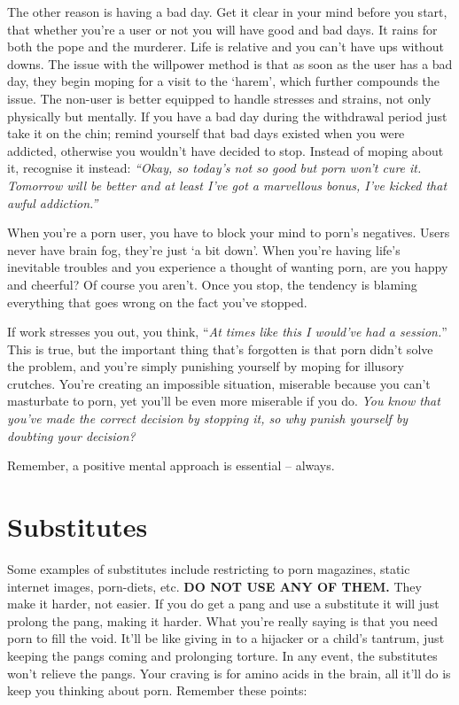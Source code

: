 \documentclass[
]{book}
\begin{document}
The other reason is having a bad day. Get it clear in your mind before you start, that whether you're a user or not you will have good and bad days. It rains for both the pope and the murderer. Life is relative and you can't have ups without downs. The issue with the willpower method is that as soon as the user has a bad day, they begin moping for a visit to the `harem', which further compounds the issue. The non-user is better equipped to handle stresses and strains, not only physically but mentally. If you have a bad day during the withdrawal period just take it on the chin; remind yourself that bad days existed when you were addicted, otherwise you wouldn't have decided to stop. Instead of moping about it, recognise it instead: \emph{``Okay, so today's not so good but porn won't cure it. Tomorrow will be better and at least I've got a marvellous bonus, I've kicked that awful addiction.''}

When you're a porn user, you have to block your mind to porn's negatives. Users never have brain fog, they're just `a bit down'. When you're having life's inevitable troubles and you experience a thought of wanting porn, are you happy and cheerful? Of course you aren't. Once you stop, the tendency is blaming everything that goes wrong on the fact you've stopped.

If work stresses you out, you think, ``\emph{At times like this I would've had a session.}'' This is true, but the important thing that's forgotten is that porn didn't solve the problem, and you're simply punishing yourself by moping for illusory crutches. You're creating an impossible situation, miserable because you can't masturbate to porn, yet you'll be even more miserable if you do. \emph{You know that you've made the correct decision by stopping it, so why punish yourself by doubting your decision?}

Remember, a positive mental approach is essential -- always.

\hypertarget{substitutes}{%
\chapter{Substitutes}\label{substitutes}}

Some examples of substitutes include restricting to porn magazines, static internet images, porn-diets, etc. \textbf{DO NOT USE ANY OF THEM.} They make it harder, not easier. If you do get a pang and use a substitute it will just prolong the pang, making it harder. What you're really saying is that you need porn to fill the void. It'll be like giving in to a hijacker or a child's tantrum, just keeping the pangs coming and prolonging torture. In any event, the substitutes won't relieve the pangs. Your craving is for amino acids in the brain, all it'll do is keep you thinking about porn. Remember these points:
\end{document}
